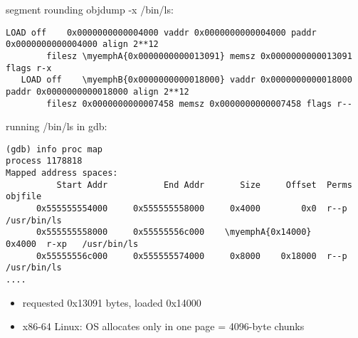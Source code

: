 \begin{frame}[fragile]{segment rounding}
\providecommand{\myemphA}[1]{\myemph<2>{#1}}
\providecommand{\myemphB}[1]{\myemph<3>{#1}}
objdump -x /bin/ls: 
\begin{Verbatim}[fontsize=\fontsize{9}{10},commandchars=\\\{\}]
   LOAD off    0x0000000000004000 vaddr 0x0000000000004000 paddr 0x0000000000004000 align 2**12
        filesz \myemphA{0x0000000000013091} memsz 0x0000000000013091 flags r-x
   LOAD off    \myemphB{0x0000000000018000} vaddr 0x0000000000018000 paddr 0x0000000000018000 align 2**12
        filesz 0x0000000000007458 memsz 0x0000000000007458 flags r--
\end{Verbatim}
running /bin/ls in gdb:
\begin{Verbatim}[fontsize=\fontsize{9}{10},commandchars=\\\{\}]
(gdb) info proc map
process 1178818
Mapped address spaces:
          Start Addr           End Addr       Size     Offset  Perms  objfile
      0x555555554000     0x555555558000     0x4000        0x0  r--p   /usr/bin/ls
      0x555555558000     0x55555556c000    \myemphA{0x14000}     0x4000  r-xp   /usr/bin/ls
      0x55555556c000     0x555555574000     0x8000    0x18000  r--p   /usr/bin/ls
....
\end{Verbatim}
\begin{itemize}
\item requested 0x13091 bytes, loaded 0x14000
\item x86-64 Linux: OS allocates only in one page = 4096-byte chunks
\end{itemize}
\end{frame}
